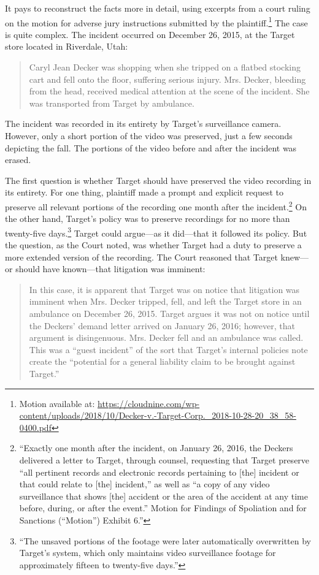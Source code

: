 \documentclass[
  10pt,
  dvipsnames,enabledeprecatedfontcommands]{scrartcl}
\begin{document}
It pays to reconstruct the facts more in detail, using excerpts from a
court ruling on the motion for adverse jury instructions submitted by
the plaintiff.\footnote{Motion available at:
  \url{https://cloudnine.com/wp-content/uploads/2018/10/Decker-v.-Target-Corp._2018-10-28-20_38_58-0400.pdf}}
The case is quite complex. The incident occurred on December 26, 2015,
at the Target store located in Riverdale, Utah:

\begin{quote}
Caryl Jean Decker was shopping when she tripped on a flatbed stocking cart and
fell onto the floor, suffering serious injury. Mrs. Decker, bleeding from the head, received medical attention at the scene of the incident. She was transported from Target by ambulance.
\end{quote}

\noindent The incident was recorded in its entirety by Target's
surveillance camera. However, only a short portion of the video was
preserved, just a few seconds depicting the fall. The portions of the
video before and after the incident was erased.

The first question is whether Target should have preserved the video
recording in its entirety. For one thing, plaintiff made a prompt and
explicit request to preserve all relevant portions of the recording one
month after the incident.\footnote{``Exactly one month after the
  incident, on January 26, 2016, the Deckers delivered a letter to
  Target, through counsel, requesting that Target preserve ``all
  pertinent records and electronic records pertaining to {[}the{]}
  incident or that could relate to {[}the{]} incident,'' as well as ``a
  copy of any video surveillance that shows {[}the{]} accident or the
  area of the accident at any time before, during, or after the event.''
  Motion for Findings of Spoliation and for Sanctions (``Motion'')
  Exhibit 6.''} On the other hand, Target's policy was to preserve
recordings for no more than twenty-five days.\footnote{``The unsaved
  portions of the footage were later automatically overwritten by
  Target's system, which only maintains video surveillance footage for
  approximately fifteen to twenty-five days.''} Target could argue---as
it did---that it followed its policy. But the question, as the Court
noted, was whether Target had a duty to preserve a more extended version
of the recording. The Court reasoned that Target knew---or should have
known---that litigation was imminent:

\begin{quote}
 In this case, it is apparent that Target was on notice that litigation was
imminent when Mrs. Decker tripped, fell, and left the Target store in an ambulance on December 26, 2015. Target argues it was not on notice until the Deckers’ demand letter arrived on January 26, 2016; however, that argument is disingenuous. Mrs. Decker fell and an ambulance was called. This was a “guest incident” of the sort that Target’s internal policies note create the “potential for a general liability claim to be brought
against Target.” 
\end{quote}
\end{document}
